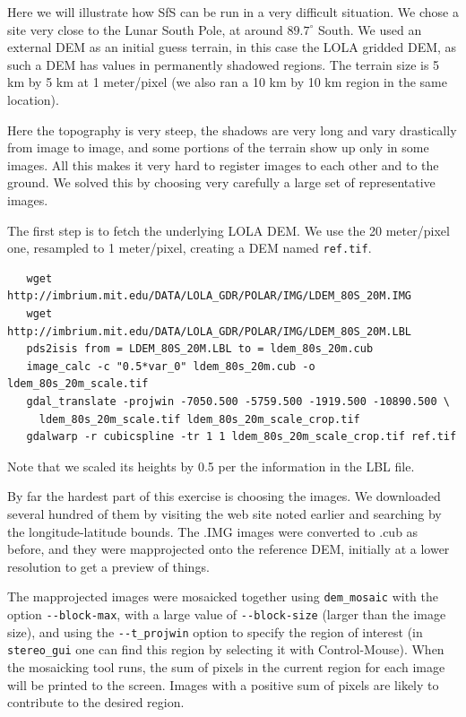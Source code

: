 Here we will illustrate how SfS can be run in a very difficult
situation. We chose a site very close to the Lunar South Pole, at around
$89.7^\circ$ South. We used an external DEM as an initial guess terrain,
in this case the LOLA gridded DEM, as such a DEM has values in
permanently shadowed regions. The terrain size is 5 km by 5 km at 1
meter/pixel (we also ran a 10 km by 10 km region in the same location).

Here the topography is very steep, the shadows are very long and vary
drastically from image to image, and some portions of the terrain show
up only in some images. All this makes it very hard to register images
to each other and to the ground. We solved this by choosing very carefully
a large set of representative images. 

The first step is to fetch the underlying LOLA DEM. We use the 20
meter/pixel one, resampled to 1 meter/pixel, creating a DEM
named \texttt{ref.tif}.

\begin{verbatim}
   wget http://imbrium.mit.edu/DATA/LOLA_GDR/POLAR/IMG/LDEM_80S_20M.IMG
   wget http://imbrium.mit.edu/DATA/LOLA_GDR/POLAR/IMG/LDEM_80S_20M.LBL
   pds2isis from = LDEM_80S_20M.LBL to = ldem_80s_20m.cub
   image_calc -c "0.5*var_0" ldem_80s_20m.cub -o ldem_80s_20m_scale.tif
   gdal_translate -projwin -7050.500 -5759.500 -1919.500 -10890.500 \
     ldem_80s_20m_scale.tif ldem_80s_20m_scale_crop.tif
   gdalwarp -r cubicspline -tr 1 1 ldem_80s_20m_scale_crop.tif ref.tif
\end{verbatim}

Note that we scaled its heights by 0.5 per the information in the LBL file.

By far the hardest part of this exercise is choosing the images. We
downloaded several hundred of them by visiting the web site noted
earlier and searching by the longitude-latitude bounds. The .IMG images
were converted to .cub as before, and they were mapprojected onto the
reference DEM, initially at a lower resolution to get a preview of
things. 

The mapprojected images were mosaicked together using
\texttt{dem\_mosaic} with the option \texttt{-\/-block-max}, with a
large value of \texttt{-\/-block-size} (larger than the image size), and
using the \texttt{-\/-t\_projwin} option to specify the region of
interest (in \texttt{stereo\_gui} one can find this region by selecting
it with Control-Mouse).  When the mosaicking tool runs, the sum of
pixels in the current region for each image will be printed to the
screen. Images with a positive sum of pixels are likely to contribute to
the desired region.


